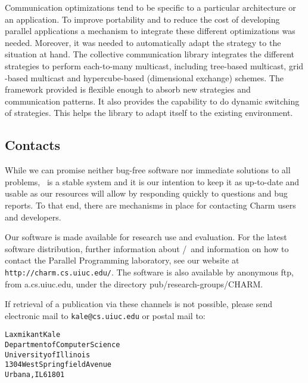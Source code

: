 Communication optimizations tend to be specific to a particular architecture or
an application. To improve portability and to reduce the cost of developing
parallel applications a mechanism to integrate these different optimizations
was needed. Moreover, it was needed to automatically adapt the strategy to the
situation at hand. The collective communication library integrates the
different strategies to perform each-to-many multicast, including tree-based
multicast, grid -based multicast and hypercube-based (dimensional exchange)
schemes. The framework provided is flexible enough to absorb new strategies and
communication patterns. It also provides the capability to do dynamic switching
of strategies. This helps the library to adapt itself to the existing
environment.

\subsection{Contacts}
\label{Distribution}

While we can promise neither bug-free software nor immediate solutions   
to all problems, \charmpp\ is a stable system and it is our intention to
keep it as up-to-date and usable as our resources will allow
by responding quickly to questions and bug reports.  To that
end, there are mechanisms in place for contacting Charm users
and developers. 

Our software is made available for research use and evaluation.
For the latest software distribution, further information about
\converse{}/\charmpp\ and information on how to contact the Parallel
Programming laboratory, see our website at \texttt{http://charm.cs.uiuc.edu/}.
The software is also available by
anonymous ftp, from a.cs.uiuc.edu, under the directory
pub/research-groups/CHARM.  

If retrieval of a publication via these channels is not possible,
please send electronic mail to \texttt{kale@cs.uiuc.edu} or postal mail to:

\begin{alltt}
   Laxmikant Kale
   Department of Computer Science 
   University of Illinois 
   1304 West Springfield Avenue 
   Urbana, IL 61801 
\end{alltt}
